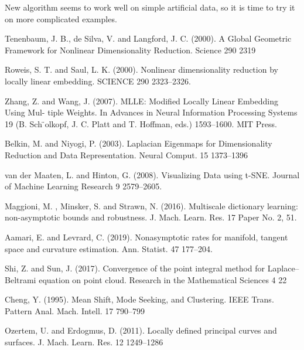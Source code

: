 \documentclass[tablecaption=bottom,wcp]{jmlr} %
\begin{document}
New algorithm seems to work well on simple artificial data, so it is time to try it on more complicated examples. 





\begin{thebibliography}{99}
 Tenenbaum, J. B., de Silva, V. and Langford, J. C. (2000). A Global Geometric
Framework for Nonlinear Dimensionality Reduction. Science 290 2319

 Roweis, S. T.
and
Saul, L. K.
(2000). Nonlinear dimensionality reduction by locally
linear embedding.
SCIENCE
290
2323–2326.

 Zhang, Z.
and
Wang, J.
(2007). MLLE: Modified Locally Linear Embedding Using Mul-
tiple Weights. In
Advances in Neural Information Processing Systems 19
(B. Sch ̈olkopf,
J. C. Platt and T. Hoffman, eds.) 1593–1600. MIT Press.

 Belkin, M.
and
Niyogi, P.
(2003). Laplacian Eigenmaps for Dimensionality Reduction
and Data Representation.
Neural Comput.
15
1373–1396

 van der Maaten, L.
and
Hinton, G.
(2008). Visualizing Data using t-SNE.
Journal of
Machine Learning Research
9
2579–2605.

 Maggioni, M.
,
Minsker, S.
and
Strawn, N.
(2016). Multiscale dictionary learning:
non-asymptotic bounds and robustness.
J. Mach. Learn. Res.
17
Paper No. 2, 51.

 Aamari, E.
and
Levrard, C.
(2019). Nonasymptotic rates for manifold, tangent space
and curvature estimation.
Ann. Statist.
47
177–204.

 Shi, Z.
and
Sun, J.
(2017). Convergence of the point integral method for Laplace–Beltrami
equation on point cloud.
Research in the Mathematical Sciences
4
22

 Cheng, Y.
(1995). Mean Shift, Mode Seeking, and Clustering.
IEEE Trans. Pattern Anal.
Mach. Intell.
17
790–799

 Ozertem, U.
and
Erdogmus, D.
(2011). Locally defined principal curves and surfaces.
J. Mach. Learn. Res.
12
1249–1286





\end{thebibliography}{}
\end{document}
